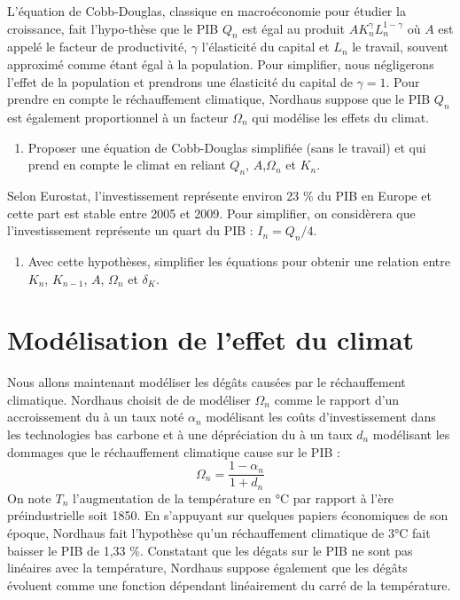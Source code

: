 \documentclass[12pt]{article}
\newcommand{\ques}[1]{\begin{enumerate}[resume]
\item  #1
\end{enumerate}}
\newcommand{\rep}[1]{\textit{Réponse :} #1 \\}
\renewcommand{\rep}[1]{ }
\theoremstyle{remark}
\begin{document}
L'équation de Cobb-Douglas, classique en macroéconomie pour étudier la croissance, fait l'hypo-thèse que le PIB $Q_n$ est égal au produit $AK_n^\gamma L_n^{1-\gamma}$ où $A$ est appelé le facteur de productivité, $\gamma$ l'élasticité du capital et $L_n$ le travail, souvent approximé comme étant égal à la population. Pour simplifier, nous négligerons l'effet de la population et prendrons une élasticité du capital de $\gamma=1$. Pour prendre en compte le réchauffement climatique, Nordhaus suppose que le PIB $Q_n$ est également proportionnel à un facteur $\Omega_n$ qui modélise les effets du climat. 
\ques{  Proposer une équation de Cobb-Douglas simplifiée (sans le travail) et qui prend en compte le climat en reliant $Q_{n}$, $A$,$\Omega_n$ et $K_{n}$.
}
\rep{ $Q_{n}=A \Omega_n K_n$ }
Selon Eurostat, l'investissement représente environ 23 \% du PIB en Europe et cette part est stable entre 2005 et 2009. Pour simplifier, on considèrera que l'investissement représente un quart du PIB : $I_n=Q_n/4$.
\ques{Avec cette hypothèses, simplifier les équations pour obtenir une relation entre $K_n$, $K_{n-1}$, $A$, $\Omega_n$ et $\delta_K$. \label{ques:dynamique_K_1}}
\rep{\begin{equation*} K_n=\frac{1- \delta_K}{1- \frac{A\Omega_n}{4}} K_{n-1}\end{equation*}}


\section{Modélisation de l'effet du climat}

Nous allons maintenant modéliser les dégâts causées par le réchauffement climatique. Nordhaus choisit de de modéliser $\Omega_n$ comme le rapport d'un accroissement du à un taux noté $\alpha_n$ modélisant les coûts d'investissement dans les technologies bas carbone et à une dépréciation du à un taux $d_n$ modélisant les dommages que le réchauffement climatique cause sur le PIB :
\begin{equation*}
\Omega_n=\frac{1-\alpha_n}{1+d_n}
\end{equation*}
On note $T_n$ l'augmentation de la température en °C par rapport à l'ère préindustrielle soit 1850.
En s'appuyant sur quelques papiers économiques de son époque, Nordhaus fait l'hypothèse qu'un réchauffement climatique de 3°C fait baisser le PIB de 1,33 \%. 
Constatant que les dégats sur le PIB ne sont pas linéaires avec la température, Nordhaus suppose également que les dégâts évoluent comme une fonction dépendant linéairement du carré de la température.
\end{document}
